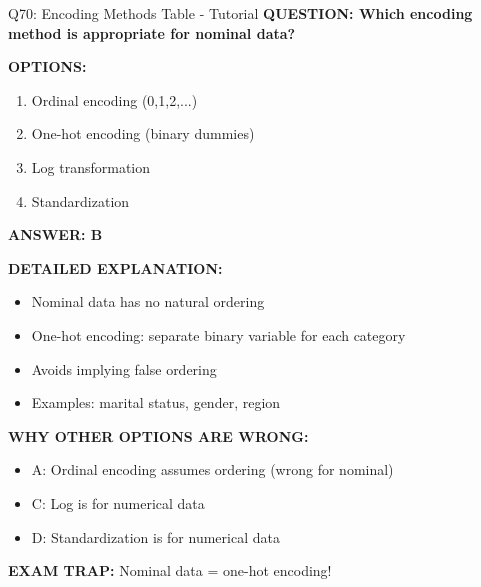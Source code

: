 \documentclass[8pt]{beamer}
\begin{document}
	\begin{frame}{Q70: Encoding Methods Table - Tutorial}
		\fontsize{6.5}{7.5}\selectfont
		\textbf{QUESTION: Which encoding method is appropriate for nominal data?}
		
		\vspace{0.1cm}
		\textbf{OPTIONS:}
		\begin{enumerate}
			\item Ordinal encoding (0,1,2,...)
			\item One-hot encoding (binary dummies)
			\item Log transformation
			\item Standardization
		\end{enumerate}
		
		\vspace{0.1cm}
		\textcolor{myblue}{\textbf{ANSWER: B}}
		
		\vspace{0.1cm}
		\textbf{DETAILED EXPLANATION:}
		\begin{itemize}
			\item Nominal data has no natural ordering
			\item One-hot encoding: separate binary variable for each category
			\item Avoids implying false ordering
			\item Examples: marital status, gender, region
		\end{itemize}
		
		\vspace{0.1cm}
		\textcolor{myred}{\textbf{WHY OTHER OPTIONS ARE WRONG:}}
		\begin{itemize}
			\item \textcolor{myred}{A:} Ordinal encoding assumes ordering (wrong for nominal)
			\item \textcolor{myred}{C:} Log is for numerical data
			\item \textcolor{myred}{D:} Standardization is for numerical data
		\end{itemize}
		
		\textcolor{myred}{\textbf{EXAM TRAP:}} Nominal data = \textcolor{myblue}{one-hot encoding}!
	\end{frame}
	
	
\end{document}
